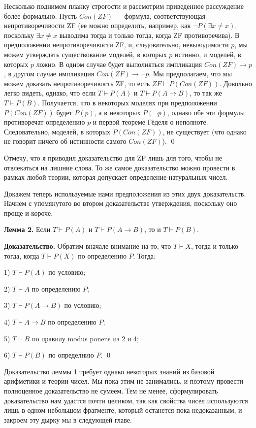 Несколько поднимем планку строгости и рассмотрим приведенное рассуждение более формально. Пусть $Con(ZF)$ — формула, соответствующая непротиворечивости ZF (ее можно определить, например, как $\neg P(\exists x\not=x)$, поскольку $\exists x \not= x$ выводима тогда и только тогда, когда ZF противоречива). В предположении непротиворечивости ZF, и, следовательно, невыводимости $p$, мы можем утверждать существование моделей, в которых $p$ истинно, и моделей, в которых $p$ ложно. В одном случае будет выполняться импликация $Con(ZF)\rightarrow p$, в другом случае импликация $Con(ZF)\rightarrow \neg p$. Мы предполагаем, что мы можем доказать непротиворечивость ZF, то есть $ZF\vdash P(Con(ZF))$. Довольно легко видеть, однако, что если $T\vdash P(A)$ и $T\vdash P(A\rightarrow B)$, то так же $T\vdash P(B)$. Получается, что в некоторых моделях при предположении $P(Con(ZF))$ будет $P(p)$, а в некоторых $P(\neg p)$, однако обе эти формулы противоречат определению $p$ и первой теореме Гёделя о неполноте. Следовательно, моделей, в которых $P(Con(ZF))$, не существует (что однако не говорит ничего об истинности самого $Con(ZF)$). \qed

Отмечу, что я приводил доказательство для ZF лишь для того, чтобы не отвлекаться на лишние слова. То же самое доказательство можно провести в рамках любой теории, которая допускает определение натуральных чисел.

Докажем теперь используемые нами предположения из этих двух доказательств. Начнем с упомянутого во втором доказательстве утверждения, поскольку оно проще и короче.

{\bfseries Лемма 2.} Если $T\vdash P(A)$ и $T\vdash P(A\rightarrow B)$, то и $T\vdash P(B)$.

{\bfseries Доказательство.} Обратим вначале внимание на то, что $T\vdash X$, тогда и только тогда, когда $T\vdash P(X)$ по определению $P$. Тогда:

1) $T\vdash P(A)$  по условию;

2) $T\vdash A$ по определению $P$;

3) $T\vdash P(A\rightarrow B)$ по условию;

4) $T\vdash A \rightarrow B$ по определению $P$;

5) $T\vdash B$ по правилу modus ponens из 2 и 4;

6) $T\vdash P(B)$ по определнию $P$. \qed

Доказательство леммы 1 требует однако некоторых знаний из базовой арифметики и теории чисел. Мы пока этим не занимались, и поэтому провести полноценное доказательство не сумеем. Тем не менее, сформулировать доказательство нам удастся почти целиком, так как свойства чисел используются лишь в одном небольшом фрагменте, который останется пока недоказанным, и закроем эту дырку мы в следующей главе.

